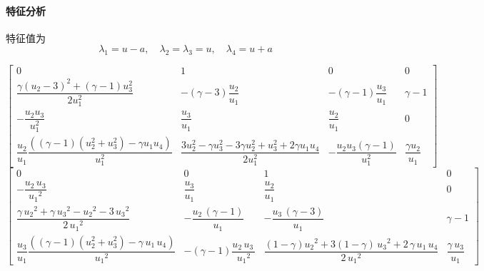 \documentclass{book}
\begin{document}
\paragraph{特征分析}
特征值为
\begin{equation}
  \lambda_{1}=u-a, \quad \lambda_{2}=\lambda_{3}=u, \quad \lambda_{4}=u+a
\end{equation}

\begin{equation}
  \begin{bmatrix}
    0                                                                                                & 1                                                                                                   & 0                                         & 0                           \\
    \dfrac{\gamma (u_{2}-3)^{2}+(\gamma-1) u_{3}^{2}}{2 u_{1}^{2}}                                   & -(\gamma-3)\dfrac{u_{2}}{u_{1}}                                                                     & -(\gamma-1)\dfrac{u_{3}}{u_{1}}           & \gamma-1                    \\
    -\dfrac{u_{2} u_{3}}{u_{1}^{2}}                                                                  & \dfrac{u_{3}}{u_{1}}                                                                                & \dfrac{u_{2}}{u_{1}}                      & 0                           \\
    \dfrac{u_{2}}{u_1}\dfrac{\left((\gamma-1)(u_{2}^{2}+u_3^2)-\gamma u_{1} u_{4}\right)}{u_{1}^{2}} & \dfrac{3 u_{2}^{2}-\gamma u_{3}^{2}-3 \gamma u_{2}^{2}+u_{3}^{2}+2 \gamma u_{1} u_{4}}{2 u_{1}^{2}} & -\dfrac{u_{2} u_{3}(\gamma-1)}{u_{1}^{2}} & \dfrac{\gamma u_{2}}{u_{1}}
  \end{bmatrix}
\end{equation}
\begin{equation}
  \begin{bmatrix}
    0                                                                                             & 0                                                        & 1                                                                                       & 0                           \\
    -\dfrac{u_2 \,u_3 }{{u_1 }^2 }                                                                & \dfrac{u_3 }{u_1 }                                       & \dfrac{u_2 }{u_1 }                                                                      & 0                           \\
    \dfrac{\gamma \,{u_2 }^2 +\gamma \,{u_3 }^2 -{u_2 }^2 -3\,{u_3 }^2 }{2\,{u_1 }^2 }            & -\dfrac{u_2 \,{\left(\gamma -1\right)}}{u_1 }            & -\dfrac{u_3 \,{\left(\gamma -3\right)}}{u_1 }                                           & \gamma -1                   \\
    \dfrac{u_3}{u_1}\dfrac{{\left((\gamma-1)(u_2^2+u_3^2)-\gamma \,u_1 \,u_4 \right)}}{{u_1 }^2 } & -{\left(\gamma -1\right)}\dfrac{u_2 \,u_3 \,}{{u_1 }^2 } & \dfrac{(1-\gamma){u_2 }^2 +3(1-\gamma)\,{u_3 }^2 +2\,\gamma \,u_1 \,u_4 }{2\,{u_1 }^2 } & \dfrac{\gamma \,u_3 }{u_1 }
  \end{bmatrix}
\end{equation}
\end{document}
